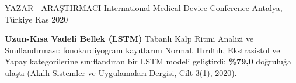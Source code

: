 \begin{cventries}
  \cventry
    {YAZAR | ARAŞTIRMACI} %
{\underline{\href{https://www.researchgate.net/profile/Yalcin-Isler-2/publication/357078829_Heart_Sounds_Analysis_and_Classification_Based_on_Long-Short_Term_Memory/links/61c338cdabcb1b520ad8e586/Heart-Sounds-Analysis-and-Classification-Based-on-Long-Short-Term-Memory.pdf}{International Medical Device Conference}}} %
    {Antalya, Türkiye} %
    {Kas 2020} %
    {
      \begin{cvitems} %
        \item {\textbf{Uzun-Kısa Vadeli Bellek (LSTM)} Tabanlı Kalp Ritmi Analizi ve Sınıflandırması: fonokardiyogram kayıtlarını Normal, Hırıltılı, Ekstrasistol ve Yapay kategorilerine sınıflandıran bir LSTM modeli geliştirdi; \textbf{\%79,0} doğruluğa ulaştı (Akıllı Sistemler ve Uygulamaları Dergisi, Cilt 3(1), 2020).}
      \end{cvitems}
    }

\end{cventries}
